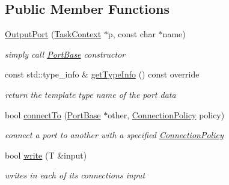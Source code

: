 \subsection*{Public Member Functions}
\begin{DoxyCompactItemize}
\item 
\hypertarget{classcoco_1_1_output_port_adfcb0f71c269f0e772a953c67f1a2d5f}{\hyperlink{classcoco_1_1_output_port_adfcb0f71c269f0e772a953c67f1a2d5f}{Output\-Port} (\hyperlink{classcoco_1_1_task_context}{Task\-Context} $\ast$p, const char $\ast$name)}\label{classcoco_1_1_output_port_adfcb0f71c269f0e772a953c67f1a2d5f}

\begin{DoxyCompactList}\small\item\em simply call \hyperlink{classcoco_1_1_port_base}{Port\-Base} constructor \end{DoxyCompactList}\item 
\hypertarget{classcoco_1_1_output_port_af98baef0b2f5e221b1023bfab6bbad57}{const std\-::type\-\_\-info \& \hyperlink{classcoco_1_1_output_port_af98baef0b2f5e221b1023bfab6bbad57}{get\-Type\-Info} () const override}\label{classcoco_1_1_output_port_af98baef0b2f5e221b1023bfab6bbad57}

\begin{DoxyCompactList}\small\item\em return the template type name of the port data \end{DoxyCompactList}\item 
\hypertarget{classcoco_1_1_output_port_a017669d64d3345abab16c2f046326147}{bool \hyperlink{classcoco_1_1_output_port_a017669d64d3345abab16c2f046326147}{connect\-To} (\hyperlink{classcoco_1_1_port_base}{Port\-Base} $\ast$other, \hyperlink{structcoco_1_1_connection_policy}{Connection\-Policy} policy)}\label{classcoco_1_1_output_port_a017669d64d3345abab16c2f046326147}

\begin{DoxyCompactList}\small\item\em connect a port to another with a specified \hyperlink{structcoco_1_1_connection_policy}{Connection\-Policy} \end{DoxyCompactList}\item 
\hypertarget{classcoco_1_1_output_port_a102bf0a02c3298ff2df613cbc1047d3d}{bool \hyperlink{classcoco_1_1_output_port_a102bf0a02c3298ff2df613cbc1047d3d}{write} (T \&input)}\label{classcoco_1_1_output_port_a102bf0a02c3298ff2df613cbc1047d3d}

\begin{DoxyCompactList}\small\item\em writes in each of its connections {\ttfamily input} \end{DoxyCompactList}\end{DoxyCompactItemize}
